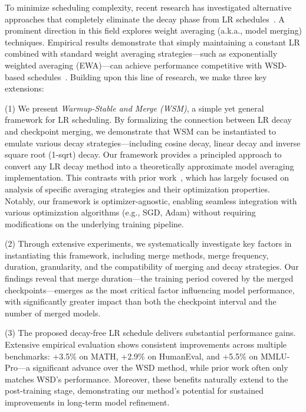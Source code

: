 To minimize scheduling complexity, recent research has investigated alternative approaches that completely eliminate the decay phase from LR schedules~\citep{Aaron2024Road,song2025through,Hanlin2025cbs}. A prominent direction in this field explores weight averaging (a.k.a., model merging) techniques. Empirical results demonstrate that simply maintaining a constant LR combined with standard weight averaging strategies—such as exponentially weighted averaging (EWA)—can achieve performance competitive with WSD-based schedules~\citep{pma}. Building upon this line of research, we make three key extensions: 

(1) We present \emph{Warmup-Stable and Merge (WSM)}, a simple yet general framework for LR scheduling. By formalizing the connection between LR decay and checkpoint merging, we demonstrate that WSM can be instantiated to emulate various decay strategies—including cosine decay, linear decay and inverse square root (1-sqrt) decay. Our framework provides a principled approach to convert any LR decay method into a theoretically approximate model averaging implementation. This contrasts with prior work~\citep{Aaron2024Road,song2025through,pma}, which has largely focused on analysis of specific averaging strategies and their optimization properties. Notably, our framework is optimizer-agnostic, enabling seamless integration with various optimization algorithms (e.g., SGD, Adam) without requiring modifications on the underlying training pipeline.

(2) Through extensive experiments, we systematically investigate key factors in instantiating this framework, including merge methods, merge frequency, duration, granularity, and the compatibility of merging and decay strategies. Our findings reveal that merge duration—the training period covered by the merged checkpoints—emerges as the most critical factor influencing model performance, with significantly greater impact than both the checkpoint interval and the number of merged models.

(3) The proposed decay-free LR schedule delivers substantial performance gains. Extensive empirical evaluation shows consistent improvements across multiple benchmarks: +3.5\% on MATH, +2.9\% on HumanEval, and +5.5\% on MMLU-Pro—a significant advance over the WSD method, while prior work often only matches WSD's performance. Moreover, these benefits naturally extend to the post-training stage, demonstrating our method's potential for sustained improvements in long-term model refinement.















